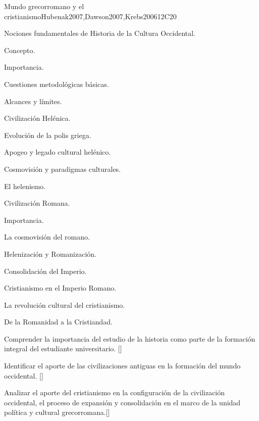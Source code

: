 \begin{syllabus}
\begin{unit}{}{Mundo grecorromano y el cristianismo}{Hubenak2007,Dawson2007,Krebs2006}{12}{C20}
\begin{topics}
	\item Nociones fundamentales de Historia de la Cultura Occidental.
	     \begin{subtopics}
		\item Concepto.
		\item Importancia.
		\item Cuestiones metodológicas básicas.
		\item Alcances y límites.
	    \end{subtopics}
	\item Civilización Helénica.
	    \begin{subtopics}
		\item Evolución de la polis griega.
		\item Apogeo y legado cultural helénico.
		\item Cosmovisión y paradigmas culturales.
		\item El helenismo.
	    \end{subtopics}
	\item Civilización Romana.
	    \begin{subtopics}
		\item Importancia.
		\item La cosmovisión del romano.
		\item Helenización y Romanización.
		\item Consolidación del Imperio.
	    \end{subtopics}
	\item Cristianismo en el Imperio Romano.
	    \begin{subtopics}
		\item La revolución cultural del cristianismo.
		\item De la Romanidad a la Cristiandad.
	    \end{subtopics}
\end{topics}
\begin{learningoutcomes}
	\item Comprender la importancia del estudio de la historia como parte de la formación integral del estudiante universitario. [\Familiarity]
	\item Identificar el aporte de las civilizaciones antiguas en la formación del mundo occidental. [\Familiarity]
	\item Analizar el aporte del cristianismo en la configuración de la civilización occidental, el proceso de expansión y consolidación en el marco de la unidad política y cultural grecorromana.[\Familiarity]
\end{learningoutcomes}
\end{unit}


\end{syllabus}

